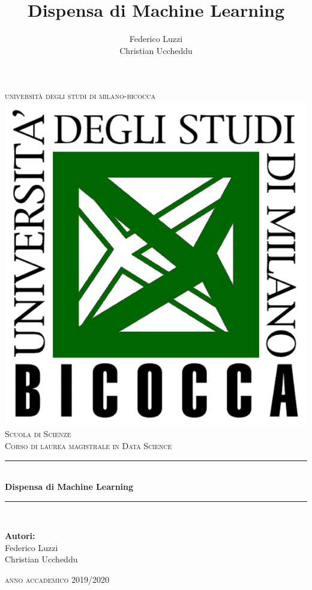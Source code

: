 \documentclass[12pt, a4paper,titlepage,openany]{article}
\title{Dispensa di Machine Learning}
\author{Federico Luzzi \\ Christian Uccheddu}
\date{}
\theoremstyle{plain}
\theoremstyle{definition}
\theoremstyle{remark}
\begin{document}
		\begin{titlepage}
		
		\newcommand{\HRule}{\rule{\linewidth}{0.5mm}} 
		
		\centering 
		

		{ 
			\textsc{\LARGE università degli studi di milano-bicocca}\\[0.5cm] 
		}
		\includegraphics[width = .3\textwidth]{Logo-Scuola.png}\\[1cm] 
		\textsc{\Large Scuola di Scienze }\\[0.25cm] 
		\textsc{\large Corso di laurea magistrale in Data Science}\\[0.75cm] 

		
		\HRule \\[0.4cm]
		{ 
			{\huge \bfseries Dispensa di Machine Learning }\\[0.4cm] %
		}
		\HRule \\[1.5cm]
		

		\begin{center}
			\large\textbf{Autori:} \\ Federico Luzzi \\ Christian Uccheddu
		\end{center}
		\vspace{3.5cm}
		{
			{\large \textsc{anno accademico 2019/2020}}\\[1cm] 
		}
		
		\vfill 
	\end{titlepage}
	
	
	
	\newpage
{}
\tableofcontents
\clearpage
{}

\clearpage

\clearpage

\clearpage

\end{document}
